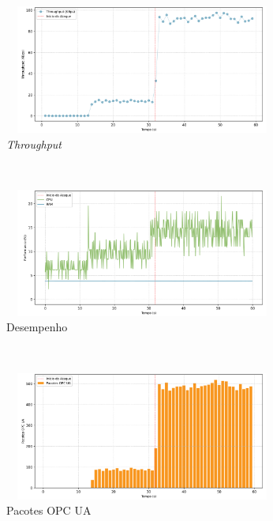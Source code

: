 \begin{apendicesenv}
\begin{figure}[htbp!]
    \centering
    \caption{\label{fig:2-dos_open_multiple_secure_channels}Gráficos do ataque de DoS pela abertura de múltiplos canais seguros - nível de segurança: `Sign \& Encrypt'.}
    \begin{subfigure}[t]{0.5\textwidth}
        \centering
        \caption{\textit{Throughput}}
        \includegraphics[width=1\textwidth, height=120pt]{USPSC-img/output/cropped/2-dos_open_multiple_secure_channels-tput.png}
    \end{subfigure}%
    ~ 
    \begin{subfigure}[t]{0.5\textwidth}
        \centering
        \caption{Desempenho}
        \includegraphics[width=1\textwidth, height=120pt]{USPSC-img/output/cropped/2-dos_open_multiple_secure_channels-perf.png}
    \end{subfigure}%
    \\
    \begin{subfigure}[t]{0.5\textwidth}
        \centering
        \caption{Pacotes OPC UA}
        \includegraphics[width=1\textwidth, height=120pt]{USPSC-img/output/cropped/2-dos_open_multiple_secure_channels-pack.png}
    \end{subfigure}%
    ~
    \begin{subfigure}[t]{0.5\textwidth}

\end{subfigure}
\end{figure}
\end{apendicesenv}
